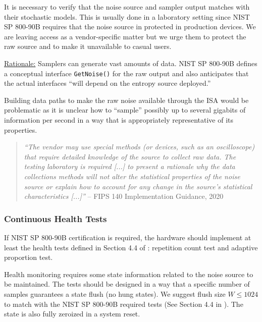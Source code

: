     It is necessary to verify that the noise source and sampler output
    matches with their stochastic models. This is usually
    done in a laboratory setting since NIST SP 800-90B \cite{TuBaKe+18}
    requires that the noise source in protected in production devices.
    We are leaving access as a vendor-specific matter but we urge them to
    protect the raw source and to make it unavailable to casual users.

    \underline{Rationale:}
    Samplers can generate vast amounts of data. NIST SP 800-90B
    \cite{TuBaKe+18} defines a conceptual interface \verb|GetNoise()|
    for the raw output and also anticipates that the actual
    interfaces ``will depend on the entropy source deployed.''

    Building data paths to make the raw noise available through the ISA
    would be problematic as it is unclear how to ``sample''
    possibly up to several gigabits of information per second in a way
    that is appropriately representative of its properties.

    \begin{quote}
    \emph{``The vendor may use special methods (or devices, such as an
    oscilloscope) that require detailed knowledge of the source to
    collect raw data. The testing laboratory is required [...] to
    present a rationale why the data collections methods will not alter
    the statistical properties
    of the noise source or explain how to account for any change
    in the source’s statistical characteristics [...]''}
    \flushright -- FIPS 140 Implementation Guidance, 2020 \cite{NICC20}
    \end{quote}



\subsubsection{Continuous Health Tests}
\label{sec:cont-tests}

    If NIST SP 800-90B certification is required, the hardware
    should implement at least the health tests defined in Section
    4.4 of \cite{TuBaKe+18}: repetition count test and adaptive
    proportion test.

    Health monitoring requires some state information related
    to the noise source to be maintained. The tests should be designed
    in a way that a specific number of samples guarantees a state
    flush (no hung states). We suggest flush size $W \leq 1024$ to
    match with the NIST SP 800-90B required tests (See Section 4.4 in
    \cite{TuBaKe+18}). The state is also fully zeroized in a system reset.

